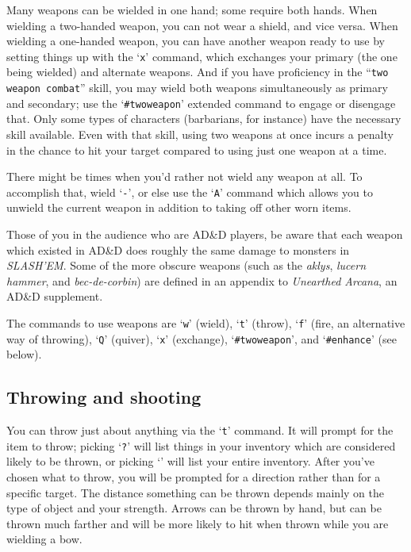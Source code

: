 Many weapons can be wielded in one hand; some require both hands.
When wielding a two-handed weapon, you can not wear a shield, and
vice versa.  When wielding a one-handed weapon, you can have another
weapon ready to use by setting things up with the `{\tt x}' command, which
exchanges your primary (the one being wielded) and alternate weapons.
And if you have proficiency in the ``{\tt two weapon combat}'' skill, you
may wield both weapons simultaneously as primary and secondary; use the
`{\tt \#twoweapon}' extended command to engage or disengage that.  Only
some types of characters (barbarians, for instance) have the necessary
skill available.  Even with that skill, using two weapons at once incurs
a penalty in the chance to hit your target compared to using just one
weapon at a time.

There might be times when you'd rather not wield any weapon at all.
To accomplish that, wield `{\tt -}', or else use the `{\tt A}' command which
allows you to unwield the current weapon in addition to taking off
other worn items.

Those of you in the audience who are AD\&D players, be aware that each
weapon which existed in AD\&D does roughly the same damage to monsters in
{\it SLASH'EM}.  Some of the more obscure weapons (such as the {\it aklys},
{\it lucern hammer}, and {\it bec-de-corbin\/}) are defined in an
appendix to {\it Unearthed Arcana}, an AD\&D supplement.

The commands to use weapons are `{\tt w}' (wield), `{\tt t}' (throw),
`{\tt f}' (fire, an alternative way of throwing), `{\tt Q}' (quiver),
`{\tt x}' (exchange), `{\tt \#twoweapon}', and `{\tt \#enhance}' (see below).
\subsection*{Throwing and shooting}


You can throw just about anything via the `{\tt t}' command.  It will prompt
for the item to throw; picking `{\tt ?}' will list things in your inventory
which are considered likely to be thrown, or picking `{\tt *}' will list
your entire inventory.  After you've chosen what to throw, you will
be prompted for a direction rather than for a specific target.  The
distance something can be thrown depends mainly on the type of object
and your strength.  Arrows can be thrown by hand, but can be thrown
much farther and will be more likely to hit when thrown while you are
wielding a bow.

